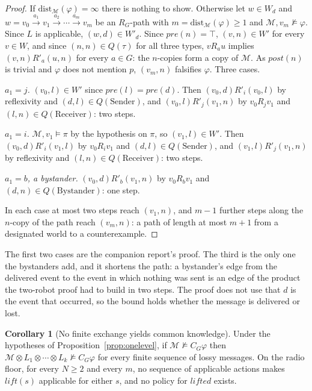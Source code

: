 \documentclass[11pt,a4paper]{article}
\theoremstyle{definition}
\newtheorem{corollary}{Corollary}
\newcommand{\Mod}{\mathcal{M}}
\newcommand{\prd}{\otimes}
\newcommand{\Cop}[1]{C_{#1}}
\newcommand{\pre}{\mathit{pre}}
\newcommand{\post}{\mathit{post}}
\newcommand{\dist}{\mathrm{dist}}
\begin{document}
\begin{proof}
If $\dist_\Mod(\varphi) = \infty$ there is nothing to show. Otherwise let
$w \in W_d$ and $w = v_0 \xrightarrow{a_1} v_1 \xrightarrow{a_2} \cdots
\xrightarrow{a_m} v_m$ be an $R_G$-path with $m = \dist_\Mod(\varphi) \geq 1$ and
$\Mod, v_m \not\models \varphi$. Since $L$ is applicable, $(w,d) \in W'_d$.
Since $\pre(n) = \top$, $(v,n) \in W'$ for every $v \in W$, and since
$(n,n) \in Q(\tau)$ for all three types, $v R_a u$ implies
$(v,n) R'_a (u,n)$ for every $a \in G$: the $n$-copies form a copy of $\Mod$.
As $\post(n)$ is trivial and $\varphi$ does not mention $p$, $(v_m, n)$
falsifies $\varphi$. Three cases.

\emph{$a_1 = j$.} $(v_0,l) \in W'$ since $\pre(l) = \pre(d)$. Then
$(v_0,d) \mathrel{R'_i} (v_0,l)$ by reflexivity and $(d,l) \in Q(\mathrm{Sender})$,
and $(v_0,l) \mathrel{R'_j} (v_1,n)$ by $v_0 R_j v_1$ and
$(l,n) \in Q(\mathrm{Receiver})$: two steps.

\emph{$a_1 = i$.} $\Mod, v_1 \models \pi$ by the hypothesis on $\pi$, so
$(v_1,l) \in W'$. Then $(v_0,d) \mathrel{R'_i} (v_1,l)$ by $v_0 R_i v_1$ and
$(d,l) \in Q(\mathrm{Sender})$, and $(v_1,l) \mathrel{R'_j} (v_1,n)$ by
reflexivity and $(l,n) \in Q(\mathrm{Receiver})$: two steps.

\emph{$a_1 = b$, a bystander.} $(v_0,d) \mathrel{R'_b} (v_1,n)$ by
$v_0 R_b v_1$ and $(d,n) \in Q(\mathrm{Bystander})$: one step.

In each case at most two steps reach $(v_1, n)$, and $m-1$ further steps along
the $n$-copy of the path reach $(v_m,n)$: a path of length at most $m+1$ from a
designated world to a counterexample.
\end{proof}

\noindent
The first two cases are the companion report's proof. The third is the only
one the bystanders add, and it shortens the path: a bystander's edge from the
delivered event to the event in which nothing was sent is an edge of the
product the two-robot proof had to build in two steps. The proof does not use
that $d$ is the event that occurred, so the bound holds whether the message is
delivered or lost.

\begin{corollary}[No finite exchange yields common knowledge]
\label{cor:radio}
Under the hypotheses of Proposition~\ref{prop:onelevel}, if
$\Mod \not\models \Cop{G}\varphi$ then
$\Mod \prd L_1 \prd \cdots \prd L_k \not\models \Cop{G}\varphi$ for every finite
sequence of lossy messages. On the radio floor, for every $N \geq 2$ and every
$m$, no sequence of applicable actions makes $\mathit{lift}(s)$ applicable for
either $s$, and no policy for $\mathit{lifted}$ exists.
\end{corollary}
\end{document}
